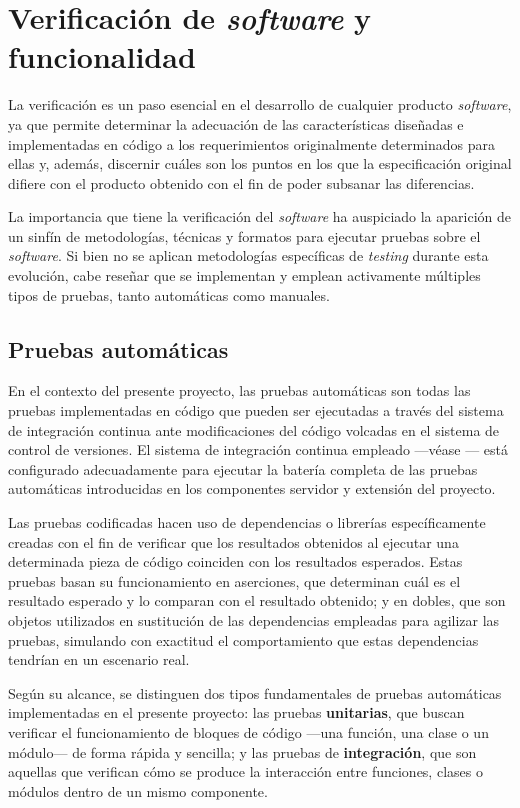 \section{Verificación de \textit{software} y funcionalidad}
\label{sec:verificacion}

La verificación es un paso esencial en el desarrollo de cualquier producto \textit{software}, ya que permite determinar la adecuación de las características diseñadas e implementadas en código a los requerimientos originalmente determinados para ellas y, además, discernir cuáles son los puntos en los que la especificación original difiere con el producto obtenido con el fin de poder subsanar las diferencias.

La importancia que tiene la verificación del \textit{software} ha auspiciado la aparición de un sinfín de metodologías, técnicas y formatos para ejecutar pruebas sobre el \textit{software}. Si bien no se aplican metodologías específicas de \textit{testing} durante esta evolución, cabe reseñar que se implementan y emplean activamente múltiples tipos de pruebas, tanto automáticas como manuales.

\subsection{Pruebas automáticas}
\label{subsec:pruebasAutomaticas}
En el contexto del presente proyecto, las pruebas automáticas son todas las pruebas implementadas en código que pueden ser ejecutadas a través del sistema de integración continua ante modificaciones del código volcadas en el sistema de control de versiones. El sistema de integración continua empleado ---véase --- está configurado adecuadamente para ejecutar la batería completa de las pruebas automáticas introducidas en los componentes servidor y extensión del proyecto. 

Las pruebas codificadas hacen uso de dependencias o librerías específicamente creadas con el fin de verificar que los resultados obtenidos al ejecutar una determinada pieza de código coinciden con los resultados esperados. Estas pruebas basan su funcionamiento en aserciones, que determinan cuál es el resultado esperado y lo comparan con el resultado obtenido; y en dobles, que son objetos utilizados en sustitución de las dependencias empleadas para agilizar las pruebas, simulando con exactitud el comportamiento que estas dependencias tendrían en un escenario real.

Según su alcance, se distinguen dos tipos fundamentales de pruebas automáticas implementadas en el presente proyecto: las pruebas \textbf{unitarias}, que buscan verificar el funcionamiento de bloques de código ---una función, una clase o un módulo--- de forma rápida y sencilla; y las pruebas de \textbf{integración}, que son aquellas que verifican cómo se produce la interacción entre funciones, clases o módulos dentro de un mismo componente.

